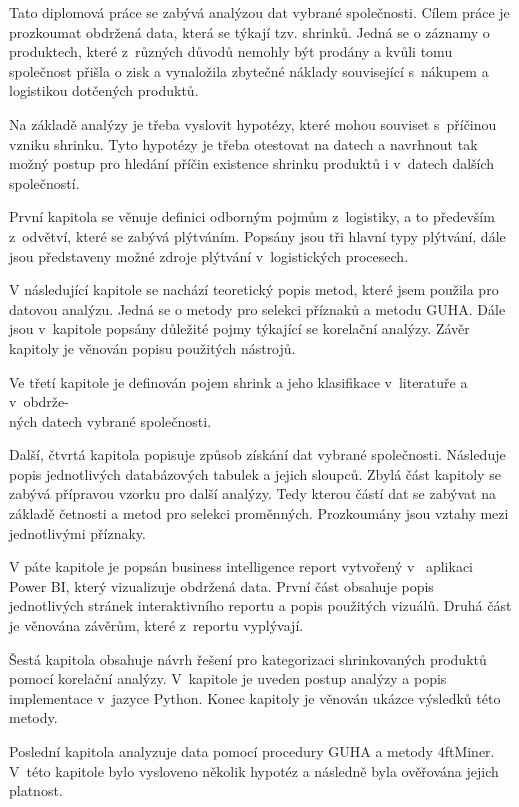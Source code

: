 Tato diplomová práce se zabývá analýzou dat vybrané společnosti. Cílem práce je prozkoumat obdržená data, která se týkají tzv. shrinků. Jedná se o záznamy o produktech, které z~různých důvodů nemohly být prodány a kvůli tomu společnost přišla o zisk a vynaložila zbytečné náklady související s~nákupem a logistikou dotčených produktů. 

Na základě analýzy je třeba vyslovit hypotézy, které mohou souviset s~příčinou vzniku shrinku. Tyto hypotézy je třeba otestovat na datech a navrhnout tak možný postup pro hledání příčin existence shrinku produktů i v~datech dalších společností. 


První kapitola se věnuje definici odborným pojmům z~logistiky, a to především z~odvětví, které se zabývá plýtváním. Popsány jsou tři hlavní typy plýtvání, dále jsou představeny možné zdroje plýtvání v~logistických procesech.

V následující kapitole se nachází teoretický popis metod, které jsem použila pro datovou analýzu. Jedná se o metody pro selekci příznaků a metodu GUHA. Dále jsou v~kapitole popsány důležité pojmy týkající se korelační analýzy. Závěr kapitoly je věnován popisu použitých nástrojů.

Ve třetí kapitole je definován pojem shrink a jeho klasifikace v~literatuře a v~obdrže-\\ných datech vybrané společnosti.

Další, čtvrtá kapitola popisuje způsob získání dat vybrané společnosti. Následuje popis jednotlivých databázových tabulek a jejich sloupců. Zbylá část kapitoly se zabývá přípravou vzorku pro další analýzy. Tedy kterou částí dat se zabývat na základě četnosti a metod pro selekci proměnných. Prozkoumány jsou vztahy mezi jednotlivými příznaky.

V páte kapitole je popsán business intelligence report vytvořený v~ aplikaci Power BI, který vizualizuje obdržená data. První část obsahuje popis jednotlivých stránek interaktivního reportu a popis použitých vizuálů. Druhá část je věnována závěrům, které z~reportu vyplývají.

Šestá kapitola obsahuje návrh řešení pro kategorizaci shrinkovaných produktů pomocí korelační analýzy. V~kapitole je uveden postup analýzy a popis implementace v~jazyce Python. Konec kapitoly je věnován ukázce výsledků této metody.

Poslední kapitola analyzuje data pomocí procedury GUHA a metody 4ftMiner. V~této kapitole bylo vysloveno několik hypotéz a následně byla ověřována jejich platnost.






